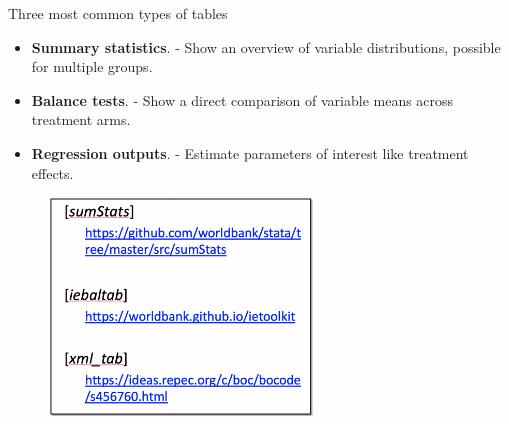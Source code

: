 \documentclass[aspectratio=169]{beamer}
\begin{document}
\begin{frame}{Three most common types of tables}
	\begin{multicols}{2}	
		
		\begin{itemize}[<default overlay specification>]
			\item<1> \textbf{Summary statistics}.
				\newline - Show an overview of variable distributions, possible for multiple groups.
			\item<1> \textbf{Balance tests}.
				\newline - Show a direct comparison of variable means across treatment arms.
			\item<1> \textbf{Regression outputs}.
				\newline - Estimate parameters of interest like treatment effects.
		\end{itemize}
		
		\begin{figure}
			\centering
			\includegraphics[width=70mm]{img/Table3}
		\end{figure}
		
	\end{multicols}
\end{frame}
\end{document}
